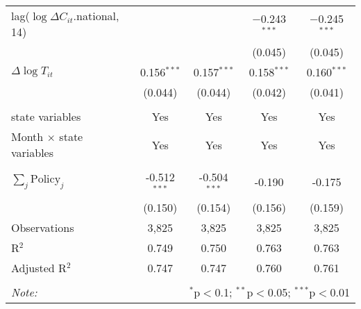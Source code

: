 \begin{tabular}{@{\extracolsep{1pt}}lcccc}
  lag($\log \Delta C_{it}$.national, 14) &  &  & $-$0.243$^{***}$ & $-$0.245$^{***}$ \\ 
  &  &  & (0.045) & (0.045) \\ 
  $\Delta \log T_{it}$ & 0.156$^{***}$ & 0.157$^{***}$ & 0.158$^{***}$ & 0.160$^{***}$ \\ 
  & (0.044) & (0.044) & (0.042) & (0.041) \\ 
 \hline \\[-1.8ex] 
state variables & Yes & Yes & Yes & Yes \\ 
Month $\times$ state variables & Yes & Yes & Yes & Yes \\ 
\hline \\[-1.8ex] 
$\sum_j \mathrm{Policy}_j$ & -0.512$^{***}$ & -0.504$^{***}$ & -0.190 & -0.175 \\ 
 & (0.150) & (0.154) & (0.156) & (0.159) \\ 
Observations & 3,825 & 3,825 & 3,825 & 3,825 \\ 
R$^{2}$ & 0.749 & 0.750 & 0.763 & 0.763 \\ 
Adjusted R$^{2}$ & 0.747 & 0.747 & 0.760 & 0.761 \\ 
\hline 
\hline \\[-1.8ex] 
\textit{Note:}  & \multicolumn{4}{r}{$^{*}$p$<$0.1; $^{**}$p$<$0.05; $^{***}$p$<$0.01} \\ 
\end{tabular} 
